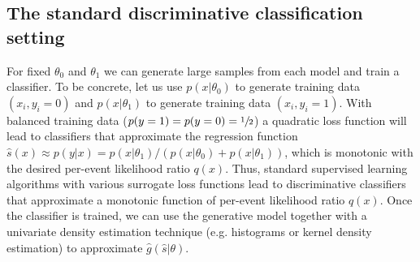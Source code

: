 \documentclass{article} %
\begin{document}
\subsection{The standard discriminative classification setting} 
For fixed $\theta_0$ and $\theta_1$ we can generate 
large samples from each model and train a classifier. To be concrete, let us use $p(x|\theta_0)$ to generate training 
data $(x_i,  y_i=0)$ and $p(x|\theta_1)$ to generate training data $(x_i , y_i=1)$. With balanced training data   ($p(y=1)=p(y=0)=\sfrac{1}{2}$) a quadratic loss function will lead to classifiers that approximate the regression function  $\hat{s}(x) \approx p(y|x) = p(x|\theta_1)/(p(x|\theta_0)+p(x|\theta_1))$, which is  monotonic with the desired per-event likelihood ratio $q(x)$. Thus, standard supervised learning algorithms with various surrogate loss functions lead to discriminative classifiers that approximate a monotonic function of per-event likelihood ratio $q(x)$.  Once the classifier is trained, we can use the generative model together with a univariate density estimation technique (e.g. histograms or kernel density estimation) to approximate $\hat{g}(\hat{s}|\theta)$.


%
%

\end{document}
